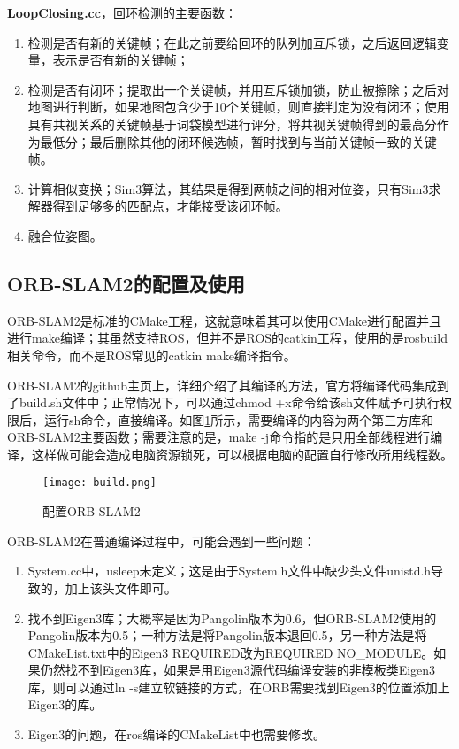 \textbf{LoopClosing.cc}，回环检测的主要函数：

\begin{enumerate}
	\item 检测是否有新的关键帧；在此之前要给回环的队列加互斥锁，之后返回逻辑变量，表示是否有新的关键帧；
	\item 检测是否有闭环；提取出一个关键帧，并用互斥锁加锁，防止被擦除；之后对地图进行判断，如果地图包含少于10个关键帧，则直接判定为没有闭环；使用具有共视关系的关键帧基于词袋模型进行评分，将共视关键帧得到的最高分作为最低分；最后删除其他的闭环候选帧，暂时找到与当前关键帧一致的关键帧。
	\item 计算相似变换；Sim3算法，其结果是得到两帧之间的相对位姿，只有Sim3求解器得到足够多的匹配点，才能接受该闭环帧。
	\item 融合位姿图。
\end{enumerate}

\subsection{ORB-SLAM2的配置及使用}
ORB-SLAM2是标准的CMake工程，这就意味着其可以使用CMake进行配置并且进行make编译；其虽然支持ROS，但并不是ROS的catkin工程，使用的是rosbuild相关命令，而不是ROS常见的catkin make编译指令。

ORB-SLAM2的github主页上，详细介绍了其编译的方法，官方将编译代码集成到了build.sh文件中；正常情况下，可以通过chmod +x命令给该sh文件赋予可执行权限后，运行sh命令，直接编译。如图\ref{fig10}所示，需要编译的内容为两个第三方库和ORB-SLAM2主要函数；需要注意的是，make -j命令指的是只用全部线程进行编译，这样做可能会造成电脑资源锁死，可以根据电脑的配置自行修改所用线程数。

\begin{figure}[!ht]
	\centering
	\texttt{[image: build.png]}
	\caption{配置ORB-SLAM2}
	\label{fig10}
\end{figure}

ORB-SLAM2在普通编译过程中，可能会遇到一些问题：
\begin{enumerate}
	\item System.cc中，usleep未定义；这是由于System.h文件中缺少头文件unistd.h导致的，加上该头文件即可。
	\item 
	找不到Eigen3库；大概率是因为Pangolin版本为0.6，但ORB-SLAM2使用的Pangolin版本为0.5；一种方法是将Pangolin版本退回0.5，另一种方法是将CMakeList.txt中的Eigen3 REQUIRED改为REQUIRED NO\_MODULE。如果仍然找不到Eigen3库，如果是用Eigen3源代码编译安装的非模板类Eigen3库，则可以通过ln -s建立软链接的方式，在ORB需要找到Eigen3的位置添加上Eigen3的库。
	\item 
	Eigen3的问题，在ros编译的CMakeList中也需要修改。
\end{enumerate}

